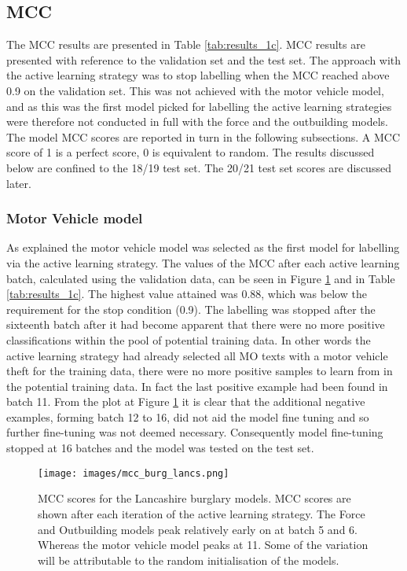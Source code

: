 \subsection{MCC} The MCC results are presented in Table \ref{tab:results_1c}. MCC results are presented with reference to the validation set and the test set. The approach with the active learning strategy was to stop labelling when the MCC reached above 0.9 on the validation set. This was not achieved with the motor vehicle model, and as this was the first model picked for labelling the active learning strategies were therefore not conducted in full with the force and the outbuilding models. The model MCC scores are reported in turn in the following subsections. A MCC score of 1 is a perfect score, 0 is equivalent to random. The results discussed below are confined to the 18/19 test set. The 20/21 test set scores are discussed later.  

\subsubsection{Motor Vehicle model} As explained the motor vehicle model was selected as the first model for labelling via the active learning strategy. The values of the MCC after each active learning batch, calculated using the validation data, can be seen in Figure \ref{fig:mcc_burg_lancs} and in Table \ref{tab:results_1c}. The highest value attained was 0.88, which was below the requirement for the stop condition (0.9). The labelling was stopped after the sixteenth batch after it had become apparent that there were no more positive classifications within the pool of potential training data. In other words the active learning strategy had already selected all MO texts with a motor vehicle theft for the training data, there were no more positive samples to learn from in the potential training data. In fact the last positive example had been found in batch 11. From the plot at Figure \ref{fig:mcc_burg_lancs} it is clear that the additional negative examples, forming batch 12 to 16, did not aid the model fine tuning and so further fine-tuning was not deemed necessary. Consequently model fine-tuning stopped at 16 batches and the model was tested on the test set.

\begin{figure}[!tbp]
  \centering
    \texttt{[image: images/mcc\_burg\_lancs.png]}
    \caption{{MCC scores for the Lancashire burglary models.} MCC scores are shown after each iteration of the active learning strategy. The Force and Outbuilding models peak relatively early on at batch 5 and 6. Whereas the motor vehicle model peaks at 11. Some of the variation will be attributable to the random initialisation of the models.}
    \label{fig:mcc_burg_lancs}
\end{figure}


